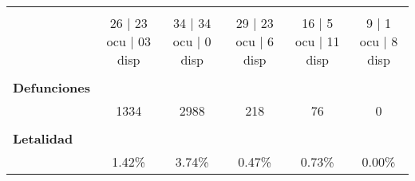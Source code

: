 \begin{tabular}{l|ccccc|}
	\multicolumn{1}{c|}{\cellcolor[HTML]{E2EFDA}} &
	\cellcolor[HTML]{FFF2CC} \\ \cline{1-1}
	&
	\multicolumn{1}{c|}{\multirow{-3}{*}{\cellcolor[HTML]{FCE4D6}26 | 23 ocu |   03 disp}} &
	\multicolumn{1}{c|}{\multirow{-3}{*}{\cellcolor[HTML]{EDEDED}34 | 34 ocu | 0 disp}} &
	\multicolumn{1}{c|}{\multirow{-3}{*}{\cellcolor[HTML]{DDEBF7}29 | 23 ocu | 6 disp}} &
	\multicolumn{1}{c|}{\multirow{-3}{*}{\cellcolor[HTML]{E2EFDA}16 | 5 ocu | 11 disp}} &
	\multirow{-3}{*}{\cellcolor[HTML]{FFF2CC}9 | 1 ocu | 8 disp} \\ \cline{2-6} 
	\textbf{} &
	\multicolumn{1}{c|}{\cellcolor[HTML]{FCE4D6}} &
	\multicolumn{1}{c|}{\cellcolor[HTML]{EDEDED}} &
	\multicolumn{1}{c|}{\cellcolor[HTML]{DDEBF7}} &
	\multicolumn{1}{c|}{\cellcolor[HTML]{E2EFDA}} &
	\cellcolor[HTML]{FFF2CC} \\ \cline{1-1}
	\multicolumn{1}{|l|}{\textbf{Defunciones}} &
	\multicolumn{1}{c|}{\cellcolor[HTML]{FCE4D6}} &
	\multicolumn{1}{c|}{\cellcolor[HTML]{EDEDED}} &
	\multicolumn{1}{c|}{\cellcolor[HTML]{DDEBF7}} &
	\multicolumn{1}{c|}{\cellcolor[HTML]{E2EFDA}} &
	\cellcolor[HTML]{FFF2CC} \\ \cline{1-1}
	&
	\multicolumn{1}{c|}{\multirow{-3}{*}{\cellcolor[HTML]{FCE4D6}1334}} &
	\multicolumn{1}{c|}{\multirow{-3}{*}{\cellcolor[HTML]{EDEDED}2988}} &
	\multicolumn{1}{c|}{\multirow{-3}{*}{\cellcolor[HTML]{DDEBF7}218}} &
	\multicolumn{1}{c|}{\multirow{-3}{*}{\cellcolor[HTML]{E2EFDA}76}} &
	\multirow{-3}{*}{\cellcolor[HTML]{FFF2CC}0} \\ \cline{2-6} 
	\textbf{} &
	\multicolumn{1}{c|}{\cellcolor[HTML]{FCE4D6}} &
	\multicolumn{1}{c|}{\cellcolor[HTML]{EDEDED}} &
	\multicolumn{1}{c|}{\cellcolor[HTML]{DDEBF7}} &
	\multicolumn{1}{c|}{\cellcolor[HTML]{E2EFDA}} &
	\cellcolor[HTML]{FFF2CC} \\ \cline{1-1}
	\multicolumn{1}{|l|}{\textbf{Letalidad}} &
	\multicolumn{1}{c|}{\cellcolor[HTML]{FCE4D6}} &
	\multicolumn{1}{c|}{\cellcolor[HTML]{EDEDED}} &
	\multicolumn{1}{c|}{\cellcolor[HTML]{DDEBF7}} &
	\multicolumn{1}{c|}{\cellcolor[HTML]{E2EFDA}} &
	\cellcolor[HTML]{FFF2CC} \\ \cline{1-1}
	&
	\multicolumn{1}{c|}{\multirow{-3}{*}{\cellcolor[HTML]{FCE4D6}1.42\%}} &
	\multicolumn{1}{c|}{\multirow{-3}{*}{\cellcolor[HTML]{EDEDED}3.74\%}} &
	\multicolumn{1}{c|}{\multirow{-3}{*}{\cellcolor[HTML]{DDEBF7}0.47\%}} &
	\multicolumn{1}{c|}{\multirow{-3}{*}{\cellcolor[HTML]{E2EFDA}0.73\%}} &
	\multirow{-3}{*}{\cellcolor[HTML]{FFF2CC}0.00\%} \\ \cline{2-6} 

\end{tabular}
